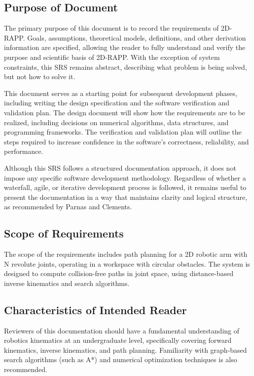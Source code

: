 \documentclass[12pt]{article}
\begin{document}
\subsection{Purpose of Document}
The primary purpose of this document is to record the requirements of 2D-RAPP. Goals, assumptions, theoretical models, definitions, and other derivation information are specified, allowing the reader to fully understand and verify the purpose and scientific basis of 2D-RAPP. With the exception of system constraints, this SRS remains abstract, describing what problem is being solved, but not how to solve it.

This document serves as a starting point for subsequent development phases, including writing the design specification and the software verification and validation plan. The design document will show how the requirements are to be realized, including decisions on numerical algorithms, data structures, and programming frameworks. The verification and validation plan will outline the steps required to increase confidence in the software’s correctness, reliability, and performance. 

Although this SRS follows a structured documentation approach, it does not impose any specific software development methodology. Regardless of whether a waterfall, agile, or iterative development process is followed, it remains useful to present the documentation in a way that maintains clarity and logical structure, as recommended by Parnas and Clements.\citet{SmithAndLai2005, SmithEtAl2007,
SmithAndKoothoor2016}



\subsection{Scope of Requirements} 
The scope of the requirements includes path planning for a 2D robotic arm with N revolute joints, operating in a workspace with circular obstacles. The system is designed to compute collision-free paths in joint space, using distance-based inverse kinematics and search algorithms.


\subsection{Characteristics of Intended Reader} \label{sec_IntendedReader}
Reviewers of this documentation should have a fundamental understanding of robotics kinematics at an undergraduate level, specifically covering forward kinematics, inverse kinematics, and path planning. Familiarity with graph-based search algorithms (such as A*) and numerical optimization techniques is also recommended.
\end{document}
